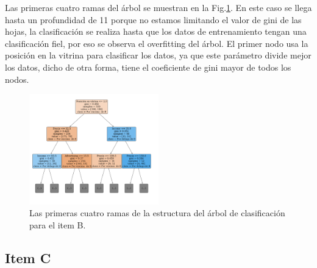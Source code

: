 Las primeras cuatro ramas del árbol se muestran en la Fig.\ref{fig:item_B_tree}. En este caso se llega hasta un profundidad de 11 porque no estamos limitando el valor de gini de las hojas, la clasificación  se realiza hasta que los datos de entrenamiento tengan una clasificación fiel, por eso se observa el overfitting del árbol. El primer nodo usa la posición en la vitrina  para clasificar los datos, ya que este parámetro divide mejor los datos, dicho de otra forma, tiene el coeficiente de gini mayor de todos los nodos.
\begin{figure}[H]
	\begin{small}
		\begin{center}
			\includegraphics[clip,trim=0 4cm {.5\wd0} 0.5cm,width=0.5\textwidth]{figures/tree_B_tree.pdf}
		\end{center}
		\caption{Las primeras cuatro ramas de la estructura del árbol de clasificación para el item B.}
		\label{fig:item_B_tree}
	\end{small}
\end{figure}


\subsection*{Item C}

